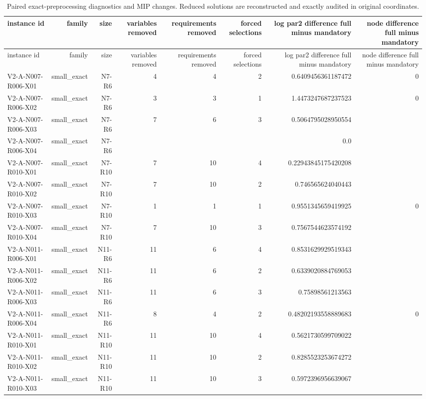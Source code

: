 {\footnotesize
\begin{longtable}{lrrrrrrr}
\caption{Paired exact-preprocessing diagnostics and MIP changes. Reduced solutions are reconstructed and exactly audited in original coordinates.}\label{tab:aor-preprocessing-reductions}\\
\toprule
instance id & family & size & variables removed & requirements removed & forced selections & log par2 difference full minus mandatory & node difference full minus mandatory \\
\midrule
\endfirsthead
\toprule
instance id & family & size & variables removed & requirements removed & forced selections & log par2 difference full minus mandatory & node difference full minus mandatory \\
\midrule
\endhead
V2-A-N007-R006-X01 & small\_exact & N7-R6 & 4 & 4 & 2 & 0.6409456361187472 & 0 \\
V2-A-N007-R006-X02 & small\_exact & N7-R6 & 3 & 3 & 1 & 1.4473247687237523 & 0 \\
V2-A-N007-R006-X03 & small\_exact & N7-R6 & 7 & 6 & 3 & 0.5064795028950554 &  \\
V2-A-N007-R006-X04 & small\_exact & N7-R6 &  &  &  & 0.0 &  \\
V2-A-N007-R010-X01 & small\_exact & N7-R10 & 7 & 10 & 4 & 0.22943845175420208 &  \\
V2-A-N007-R010-X02 & small\_exact & N7-R10 & 7 & 10 & 2 & 0.746565624040443 &  \\
V2-A-N007-R010-X03 & small\_exact & N7-R10 & 1 & 1 & 1 & 0.9551345659419925 & 0 \\
V2-A-N007-R010-X04 & small\_exact & N7-R10 & 7 & 10 & 3 & 0.7567544623574192 &  \\
V2-A-N011-R006-X01 & small\_exact & N11-R6 & 11 & 6 & 4 & 0.8531629929519343 &  \\
V2-A-N011-R006-X02 & small\_exact & N11-R6 & 11 & 6 & 2 & 0.6339020884769053 &  \\
V2-A-N011-R006-X03 & small\_exact & N11-R6 & 11 & 6 & 3 & 0.75898561213563 &  \\
V2-A-N011-R006-X04 & small\_exact & N11-R6 & 8 & 4 & 2 & 0.48202193558889683 & 0 \\
V2-A-N011-R010-X01 & small\_exact & N11-R10 & 11 & 10 & 4 & 0.5621730599709022 &  \\
V2-A-N011-R010-X02 & small\_exact & N11-R10 & 11 & 10 & 2 & 0.8285523253674272 &  \\
V2-A-N011-R010-X03 & small\_exact & N11-R10 & 11 & 10 & 3 & 0.5972396956639067 &  \\

\end{longtable}}
